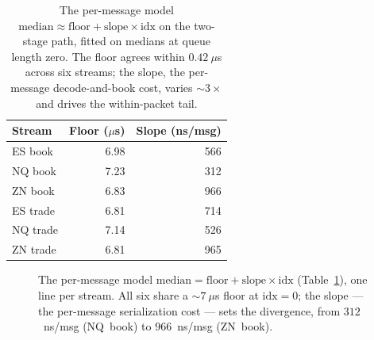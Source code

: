 \documentclass[11pt]{article}
\begin{document}
\begin{table}[t]
\centering
\caption{The per-message model
$\text{median}\approx\text{floor}+\text{slope}\times\text{idx}$ on the two-stage
path, fitted on medians at queue length zero. The floor agrees within
$0.42~\mu$s across six streams; the slope, the per-message decode-and-book cost,
varies $\sim\!3\times$ and drives the within-packet tail.}
\label{tab:floorslope}
\small
\begin{tabular}{lrr}
\toprule
Stream & Floor ($\mu$s) & Slope (ns/msg) \\
\midrule
ES book  & 6.98 & 566 \\
NQ book  & 7.23 & 312 \\
ZN book  & 6.83 & 966 \\
ES trade & 6.81 & 714 \\
NQ trade & 7.14 & 526 \\
ZN trade & 6.81 & 965 \\
\bottomrule
\end{tabular}
\end{table}

\begin{figure}[t]
\centering
{}
\caption{The per-message model $\text{median}=\text{floor}+\text{slope}\times
\text{idx}$ (Table~\ref{tab:floorslope}), one line per stream. All six share a $\sim\!7~\mu$s floor at $\text{idx}=0$; the slope ---
the per-message serialization cost --- sets the divergence, from $312$~ns/msg (NQ~book) to
$966$~ns/msg (ZN~book).}
\label{fig:floorslope}
\end{figure}
\end{document}
